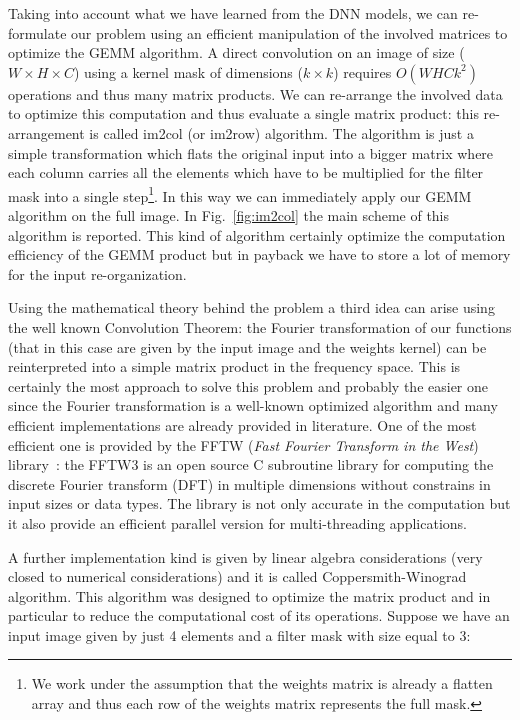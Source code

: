 \documentclass{standalone}
\begin{document}
Taking into account what we have learned from the DNN models, we can re-formulate our problem using an efficient manipulation of the involved matrices to optimize the GEMM algorithm.
A direct convolution on an image of size ($W\times H\times C$) using a kernel mask of dimensions ($k \times k$) requires $O(WHCk^2)$ operations and thus many matrix products.
We can re-arrange the involved data to optimize this computation and thus evaluate a single matrix product: this re-arrangement is called \textsf{im2col} (or \textsf{im2row}) algorithm.
The algorithm is just a simple transformation which flats the original input into a bigger matrix where each column carries all the elements which have to be multiplied for the filter mask into a single step\footnote{
  We work under the assumption that the weights matrix is already a flatten array and thus each row of the weights matrix represents the full mask.
}.
In this way we can immediately apply our GEMM algorithm on the full image.
In Fig.~\ref{fig:im2col} the main scheme of this algorithm is reported.
This kind of algorithm certainly optimize the computation efficiency of the GEMM product but in payback we have to store a lot of memory for the input re-organization.

Using the mathematical theory behind the problem a third idea can arise using the well known Convolution Theorem: the Fourier transformation of our functions (that in this case are given by the input image and the weights kernel) can be reinterpreted into a simple matrix product in the frequency space.
This is certainly the most  approach to solve this problem and probably the easier one since the Fourier transformation is a well-known optimized algorithm and many efficient implementations are already provided in literature.
One of the most efficient one is provided by the FFTW (\emph{Fast Fourier Transform in the West}) library~\cite{FFTW05}: the FFTW3 is an open source C subroutine library for computing the discrete Fourier transform (DFT) in multiple dimensions without constrains in input sizes or data types.
The library is not only accurate in the computation but it also provide an efficient parallel version for multi-threading applications.

A further implementation kind is given by linear algebra considerations (very closed to numerical considerations) and it is called Coppersmith-Winograd algorithm.
This algorithm was designed to optimize the matrix product and in particular to reduce the computational cost of its operations.
Suppose we have an input image given by just 4 elements and a filter mask with size equal to 3:
\end{document}
